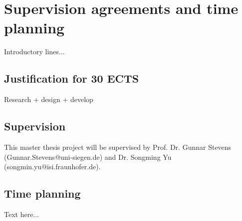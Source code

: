 \chapter{Supervision agreements and time planning} 

Introductory lines...

\section{Justification for 30 ECTS}

Research + design + develop

\section{Supervision}

This master thesis project will be supervised by 
Prof. Dr. Gunnar Stevens (Gunnar.Stevens@uni-siegen.de) and 
Dr. Songming Yu (songmin.yu@isi.fraunhofer.de).  

\section{Time planning}

Text here...